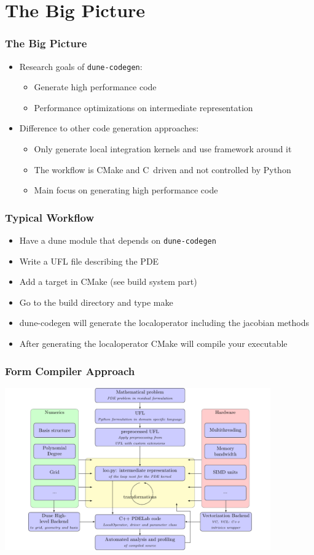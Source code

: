 \documentclass[aspectratio=169,11pt]{beamer}
\theoremstyle{definition}
\def\CC{{C\nolinebreak[4]\hspace{-.05em}\raisebox{.4ex}{\tiny\bf ++}}}
\begin{document}
\section{The Big Picture}

\begin{frame}[fragile]
  \frametitle{The Big Picture}
  \begin{itemize}
  \item Research goals of \lstinline{dune-codegen}:
    \begin{itemize}
    \item Generate high performance code
    \item Performance optimizations on intermediate representation
    \end{itemize}
  \item Difference to other code generation approaches:
    \begin{itemize}
    \item Only generate local integration kernels and use framework around it
    \item The workflow is CMake and \CC\ driven and not controlled by Python
    \item Main focus on generating high performance code
    \end{itemize}
  \end{itemize}
\end{frame}

\begin{frame}
  \frametitle{Typical Workflow}
  \begin{itemize}
  \item Have a dune module that depends on \lstinline{dune-codegen}
  \item Write a UFL file describing the PDE
  \item Add a target in CMake (see build system part)
  \item Go to the build directory and type make
  \item dune-codegen will generate the localoperator including the jacobian methods
  \item After generating the localoperator CMake will compile your executable
  \end{itemize}
\end{frame}

\begin{frame}
 \frametitle{Form Compiler Approach}
 \centering
 \includegraphics[width=4.5in]{./figures/approach.pdf}
\end{frame}
\end{document}
